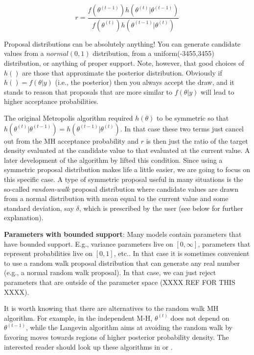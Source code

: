 \[
r = \frac{ f(\theta^{(t-1)}) h(\theta^{(t)}|\theta^{(t-1)})}
    {f(\theta^{(t)}) h(\theta^{(t-1)}|\theta^{(t)}) }
\]

Proposal distributions can be absolutely
anything!  You can generate candidate values from a $normal(0,1)$
distribution, from a uniform(-3455,3455) distribution, or anything of
proper support.  Note, however, that good choices of $h()$ are those
that approximate the posterior distribution. Obviously if $h() =
f(\theta|y)$ (i.e., the posterior) then you always accept the draw,
and it stands to reason that proposals that are more similar to
$f(\theta|y)$ will lead to higher acceptance probabilities. 

The original Metropolis algorithm
required $h(\theta)$ to be symmetric so that
$h(\theta^{(t)}|\theta^{(t-1)}) = h(\theta^{(t-1)}|\theta^{(t)})$. 
In that case these two terms just cancel
out from the MH acceptance probability and $r$ is then just the ratio
of the target density evaluated at the candidate value to that
evaluated at the current value. A later
development of the algorithm by \citet{hastings:1970} lifted this
condition. 
Since using a symmetric proposal distribution makes life a little
easier, we are going to focus on this specific case. A type of symmetric proposal useful in many situations is the
so-called {\it random-walk} proposal distribution where candidate values
are drawn from a normal distribution with mean equal to the current
value and some standard deviation, say $\delta$, which is prescribed by
the user (see below for further explanation). 

{\bf Parameters with bounded support}: Many models contain parameters that
have  bounded support. E.g., variance parameters live on $[0,\infty]$,
parameters that represent probabilities live on $[0,1]$, etc..
 In that case it is sometimes convenient to use a random
walk proposal distribution that can generate any real number (e.g., a
normal random walk proposal). In that case,
we can just reject parameters that are
outside of the parameter space (XXXX REF FOR THIS XXXX).

It is worth
knowing that there are alternatives to the random walk MH algorithm. For
example, in the independent M-H, $\theta^{(t)}$ does not depend on
$\theta^{(t-1)}$, while the Langevin algorithm \citep{roberts_etal:1998}
aims at avoiding the random walk by favoring moves towards regions of
higher posterior probability density. The interested reader should
look up these algorithms in \citet{robert_casella:2004} or
\citet{robert_casella:2010}.

